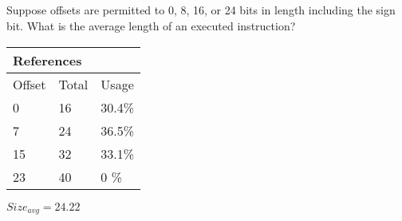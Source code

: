 \documentclass{article}
\begin{document}
\subsection{}
Suppose offsets are permitted to 0, 8, 16, or 24 bits in length including the sign bit. What is the average length of an executed instruction? \\

\begin{multicols}{3}
\begin{minipage}{\linewidth}
\begin{tabular}{|l|l|l|}
\hline
\multicolumn{3}{|l|}{References}\\
\hline
Offset & Total & Usage \\
\hline
0 & 16 & 30.4\%\\
7 & 24 & 36.5\%\\
15 & 32 & 33.1\%\\
23 & 40 & 0 \%\\
\hline
\end{tabular}\par
\bigskip
$Size_{avg}=24.22$\\


\end{minipage}
\end{multicols}
\end{document}

